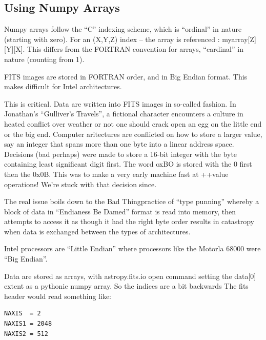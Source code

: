 \subsection{Using Numpy Arrays}

Numpy arrays follow the ``C'' indexing scheme, which is ``ordinal'' in nature
(starting with zero). For an (X,Y,Z) index -- the array is referenced :
myarray[Z][Y][X]. This differs from the FORTRAN convention for arrays, ``cardinal''
in nature (counting from 1).

FITS images are stored in FORTRAN order, and in Big Endian format. This makes
difficult for Intel architectures.

This is critical. Data are written into FITS images in so-called 
fashion. In Jonathan's ``Gulliver's Travels'', a fictional character encounters
a culture in heated conflict over weather or not one should crack open an
egg on the little end or the big end. Computer aritectures are conflicted on
how to store a larger value, say an integer that spans more than one byte
into a linear address space. Decisions (bad perhaps) were made to store
a 16-bit integer with the byte containing least significant digit first.
The word oxBO is stored with the 0 first then the 0x0B. This was to make
a very early machine fast at ++value operations! We're stuck with that decision
since.

The real issue boils down to the Bad Thing\texttrademark practice of
``type punning'' whereby a block of data in ``Endianess Be Damed''
format is read into memory, then attempts to access it as though it
had the right byte order results in catastropy when data is exchanged
between the types of architectures.

Intel processors are ``Little Endian'' where processors like the Motorla
68000 were ``Big Endian''. 

Data are stored as arrays, with astropy.fits.io open command setting the
data[0] extent as a pythonic numpy array. So the indices are a bit backwards
The fits header would read something like:

\begingroup \fontsize{10pt}{10pt}
\selectfont
\begin{verbatim} 
NAXIS  = 2
NAXIS1 = 2048
NAXIS2 = 512
\end{verbatim}
\endgroup

